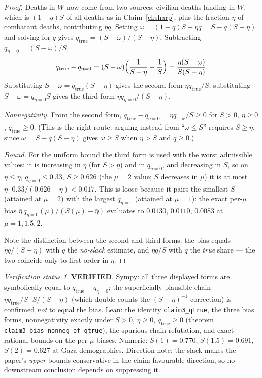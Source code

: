 \documentclass[11pt,a4paper]{article}
\theoremstyle{plain}
\theoremstyle{remark}
\newtheorem*{verification}{Verification status}
\newcommand{\PASS}{\textcolor{green!50!black}{\textbf{VERIFIED}}}
\begin{document}
\begin{proof}
Deaths in $W$ now come from two sources: civilian deaths landing in $W$, which is $(1-q)S$ of all deaths as in Claim~\ref{cl:sharp}, plus the fraction $\eta$ of combatant deaths, contributing $\eta q$. Setting $\omega=(1-q)S+\eta q=S-q(S-\eta)$ and solving for $q$ gives $q_{\mathrm{true}}=(S-\omega)/(S-\eta)$. Subtracting $q_{\eta=0}=(S-\omega)/S$,
\[
q_{\mathrm{true}}-q_{\eta=0}
=(S-\omega)\Bigl(\frac{1}{S-\eta}-\frac{1}{S}\Bigr)
=\frac{\eta(S-\omega)}{S(S-\eta)}.
\]
Substituting $S-\omega=q_{\mathrm{true}}(S-\eta)$ gives the second form $\eta q_{\mathrm{true}}/S$; substituting $S-\omega=q_{\eta=0}S$ gives the third form $\eta q_{\eta=0}/(S-\eta)$.

\emph{Nonnegativity.} From the second form, $q_{\mathrm{true}}-q_{\eta=0}=\eta q_{\mathrm{true}}/S\ge 0$ for $S>0$, $\eta\ge 0$, $q_{\mathrm{true}}\ge 0$. (This is the right route: arguing instead from ``$\omega\le S$'' requires $S\ge\eta$, since $\omega=S-q(S-\eta)$ gives $\omega\ge S$ when $\eta>S$ and $q\ge 0$.)

\emph{Bound.} For the uniform bound the third form is used with the worst admissible values: it is increasing in $\eta$ (for $S>\eta$) and in $q_{\eta=0}$, and decreasing in $S$, so on $\eta\le\bar\eta$, $q_{\eta=0}\le 0.33$, $S\ge 0.626$ (the $\mu=2$ value; $S$ decreases in $\mu$) it is at most $\bar\eta\cdot 0.33/(0.626-\bar\eta)<0.017$. This is loose because it pairs the smallest $S$ (attained at $\mu=2$) with the largest $q_{\eta=0}$ (attained at $\mu=1$): the exact per-$\mu$ bias $\bar\eta\,q_{\eta=0}(\mu)/(S(\mu)-\bar\eta)$ evaluates to $0.0130$, $0.0110$, $0.0083$ at $\mu=1,1.5,2$.

Note the distinction between the second and third forms: the bias equals $\eta q/(S-\eta)$ with $q$ the \emph{no-slack} estimate, and $\eta q/S$ with $q$ the \emph{true} share --- the two coincide only to first order in $\eta$.
\end{proof}

\begin{verification}
\PASS. Sympy: all three displayed forms are symbolically equal to $q_{\mathrm{true}}-q_{\eta=0}$; the superficially plausible chain $\eta q_{\mathrm{true}}/S\cdot S/(S-\eta)$ (which double-counts the $(S-\eta)^{-1}$ correction) is confirmed \emph{not} to equal the bias. Lean: the identity \texttt{claim3\_qtrue}, the three bias forms, nonnegativity exactly under $S>0$, $\eta\ge0$, $q_{\mathrm{true}}\ge0$ (theorem \texttt{claim3\_bias\_nonneg\_of\_qtrue}), the spurious-chain refutation, and exact rational bounds on the per-$\mu$ biases. Numeric: $S(1)=0.770$, $S(1.5)=0.691$, $S(2)=0.627$ at Gaza demographics. Direction note: the slack makes the paper's \emph{upper} bounds conservative in the claim-favourable direction, so no downstream conclusion depends on suppressing it.
\end{verification}
\end{document}
